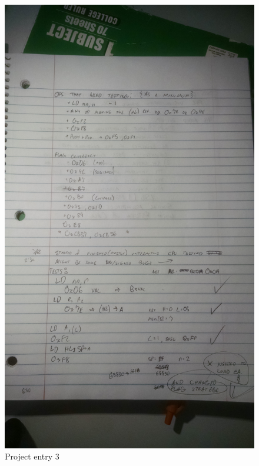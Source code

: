 \documentclass{article}
\begin{document}
    \begin{figure}[h]
        \centering
        \includegraphics[width=12cm, keepaspectratio]{entry_3}
        \caption{Project entry 3}
    \end{figure}
\end{document}
